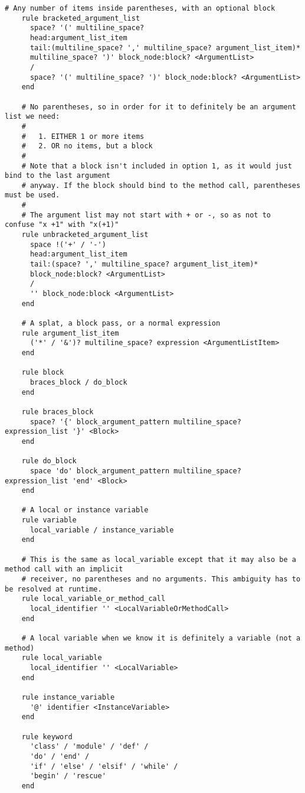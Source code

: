 \begin{lstlisting}[title={\small\ttfamily\bfseries parser/language.treetop},language=treetop]
    # Any number of items inside parentheses, with an optional block
    rule bracketed_argument_list
      space? '(' multiline_space?
      head:argument_list_item
      tail:(multiline_space? ',' multiline_space? argument_list_item)*
      multiline_space? ')' block_node:block? <ArgumentList>
      /
      space? '(' multiline_space? ')' block_node:block? <ArgumentList>
    end
    
    # No parentheses, so in order for it to definitely be an argument list we need:
    #
    #   1. EITHER 1 or more items
    #   2. OR no items, but a block
    #
    # Note that a block isn't included in option 1, as it would just bind to the last argument
    # anyway. If the block should bind to the method call, parentheses must be used.
    # 
    # The argument list may not start with + or -, so as not to confuse "x +1" with "x(+1)"
    rule unbracketed_argument_list
      space !('+' / '-')
      head:argument_list_item
      tail:(space? ',' multiline_space? argument_list_item)*
      block_node:block? <ArgumentList>
      /
      '' block_node:block <ArgumentList>
    end
    
    # A splat, a block pass, or a normal expression
    rule argument_list_item
      ('*' / '&')? multiline_space? expression <ArgumentListItem>
    end
    
    rule block
      braces_block / do_block
    end
    
    rule braces_block
      space? '{' block_argument_pattern multiline_space? expression_list '}' <Block>
    end
    
    rule do_block
      space 'do' block_argument_pattern multiline_space? expression_list 'end' <Block>
    end
    
    # A local or instance variable
    rule variable
      local_variable / instance_variable
    end
    
    # This is the same as local_variable except that it may also be a method call with an implicit
    # receiver, no parentheses and no arguments. This ambiguity has to be resolved at runtime.
    rule local_variable_or_method_call
      local_identifier '' <LocalVariableOrMethodCall>
    end
    
    # A local variable when we know it is definitely a variable (not a method)
    rule local_variable
      local_identifier '' <LocalVariable>
    end
    
    rule instance_variable
      '@' identifier <InstanceVariable>
    end
    
    rule keyword
      'class' / 'module' / 'def' /
      'do' / 'end' /
      'if' / 'else' / 'elsif' / 'while' /
      'begin' / 'rescue'
    end
    

\end{lstlisting}

